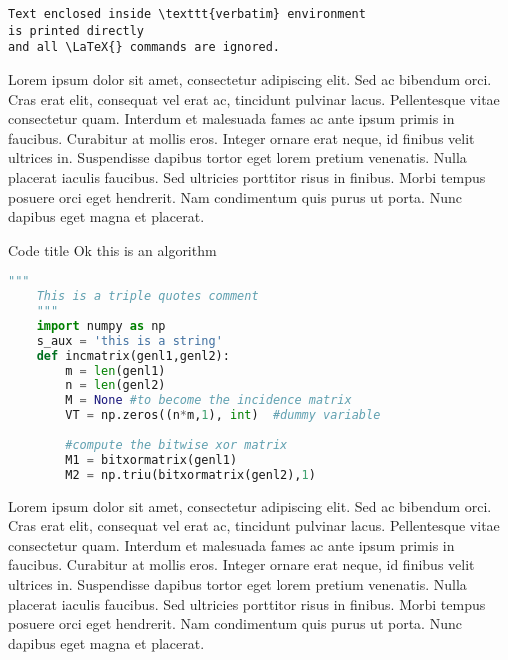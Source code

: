 \documentclass[./main.tex]{subfiles}
\begin{document}
\begin{verbatim}
Text enclosed inside \texttt{verbatim} environment 
is printed directly 
and all \LaTeX{} commands are ignored.
\end{verbatim}

\par Lorem ipsum dolor sit amet, consectetur adipiscing elit. Sed ac bibendum orci. Cras erat elit, consequat vel erat ac, tincidunt pulvinar lacus. Pellentesque vitae consectetur quam. Interdum et malesuada fames ac ante ipsum primis in faucibus. Curabitur at mollis eros. Integer ornare erat neque, id finibus velit ultrices in. Suspendisse dapibus tortor eget lorem pretium venenatis. Nulla placerat iaculis faucibus. Sed ultricies porttitor risus in finibus. Morbi tempus posuere orci eget hendrerit. Nam condimentum quis purus ut porta. Nunc dapibus eget magna et placerat.


\begin{algbox}[
    label={mynamelabel},
    nameref={Title or anything else}
    ]{Code title}
    Ok this is an algorithm
    \tcblower
    \begin{lstlisting}[language=Python]
    """
    This is a triple quotes comment
    """
    import numpy as np
    s_aux = 'this is a string'
    def incmatrix(genl1,genl2):
        m = len(genl1)
        n = len(genl2)
        M = None #to become the incidence matrix
        VT = np.zeros((n*m,1), int)  #dummy variable
        
        #compute the bitwise xor matrix
        M1 = bitxormatrix(genl1)
        M2 = np.triu(bitxormatrix(genl2),1) 
    \end{lstlisting}
    \label{box:02}
\end{algbox}

\par Lorem ipsum dolor sit amet, consectetur adipiscing elit. Sed ac bibendum orci. Cras erat elit, consequat vel erat ac, tincidunt pulvinar lacus. Pellentesque vitae consectetur quam. Interdum et malesuada fames ac ante ipsum primis in faucibus. Curabitur at mollis eros. Integer ornare erat neque, id finibus velit ultrices in. Suspendisse dapibus tortor eget lorem pretium venenatis. Nulla placerat iaculis faucibus. Sed ultricies porttitor risus in finibus. Morbi tempus posuere orci eget hendrerit. Nam condimentum quis purus ut porta. Nunc dapibus eget magna et placerat.
\end{document}
